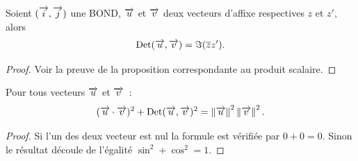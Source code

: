 \begin{prop}
  Soient $(\overrightarrow{i},\overrightarrow{j})$ une BOND, $\overrightarrow{u}$ et $\overrightarrow{v}$ deux vecteurs d'affixe respectives $z$ et $z'$, alors 
\begin{equation}
  \operatorname{Det}(\overrightarrow{u},\overrightarrow{v})=\Im(\overline{z}z').
\end{equation}
\end{prop}
\begin{proof}
  Voir la preuve de la proposition correspondante au produit scalaire.
\end{proof}
\begin{prop}
  Pour tous vecteurs $\overrightarrow{u}$ et $\overrightarrow{v}$~:
  \begin{equation}
    (\overrightarrow{u} \cdot \overrightarrow{v})^2+\operatorname{Det}(\overrightarrow{u},\overrightarrow{v})^2=\left\lVert\overrightarrow{u}\right\rVert^2 \left\lVert\overrightarrow{v}\right\rVert^2.
  \end{equation}
\end{prop}
\begin{proof}
  Si l'un des deux vecteur est nul la formule est vérifiée par $0+0=0$. Sinon le résultat découle de l'égalité $\sin^2+\cos^2=1$.
\end{proof}

